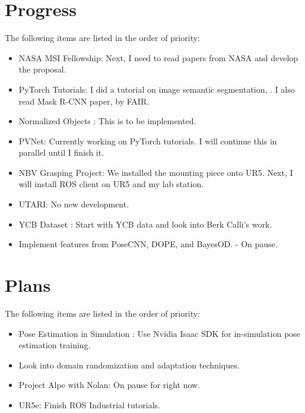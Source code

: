\documentclass[11pt]{article}
\begin{document}
\section{Progress}
The following items are listed in the order of priority:
\begin{itemize}
      \item NASA MSI Fellowship: Next, I need to read papers from NASA
      \cite{NASATech44:online} and develop the proposal.
      \item PyTorch Tutorials: I did a tutorial on image semantic segmentation,
      \cite{TorchVis74:online}. I also read Mask R-CNN paper, \cite{he2017mask}
      by FAIR.
      \item Normalized Objects \cite{Wang_2019_CVPR}: This is to be implemented.
      \item PVNet: Currently working on PyTorch tutorials. I will continue this
      in parallel until I finish it.

      \item NBV Grasping Project: We installed the mounting piece onto UR5.
      Next, I will install ROS client on UR5 and my lab station.



      \item UTARI: No new development.

      \item YCB Dataset \cite{calli2015ycb}: Start with YCB data and look into
      Berk Calli's work.

      \item Implement features from PoseCNN, DOPE, and BayesOD. - On pause.
\end{itemize}


\section{Plans}
The following items are listed in the order of priority:

\begin{itemize}
      \item Pose Estimation in Simulation \cite{NVIDIAIs75:online}: Use Nvidia
      Isaac SDK for in-simulation pose estimation training.
      \item Look into domain randomization and adaptation techniques.
      \item Project Alpe with Nolan: On pause for right now.
      \item UR5e: Finish ROS Industrial tutorials.
\end{itemize}
\end{document}
